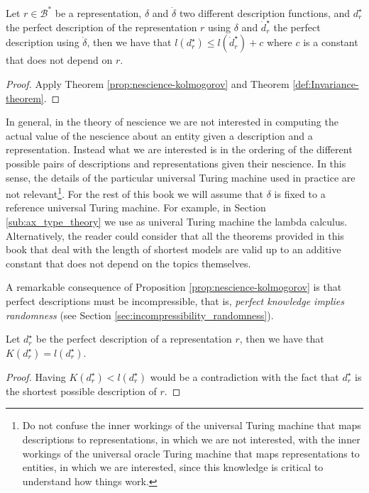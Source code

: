 \begin{corollary}
Let $r \in \mathcal{B}^\ast$ be a representation, $\delta$ and $\dot{\delta}$ two different description functions, and $d_r^{\star}$ the perfect description of the representation $r$ using $\delta$ and $\dot{d}_r^{\star}$ the perfect description using $\dot{\delta}$, then we have that $l \left( d_r^{\star} \right) \leq l \left( \dot{d}_r^{\star} \right) + c$ where $c$ is a constant that does not depend on $r$.
\end{corollary}
\begin{proof}
Apply Theorem \ref{prop:nescience-kolmogorov} and Theorem \ref{def:Invariance-theorem}.
\end{proof}

In general, in the theory of nescience we are not interested in computing the actual value of the nescience about an entity given a description and a representation. Instead what we are interested is in the ordering of the different possible pairs of descriptions and representations given their nescience. In this sense, the details of the particular universal Turing machine used in practice are not relevant\footnote{Do not confuse the inner workings of the universal Turing machine that maps descriptions to representations, in which we are not interested, with the inner workings of the universal oracle Turing machine that maps representations to entities, in which we are interested, since this knowledge is critical to understand how things work.}. For the rest of this book we will assume that $\delta$ is fixed to a reference universal Turing machine. For example, in Section \ref{sub:ax_type_theory} we use as univeral Turing machine the lambda calculus. Alternatively, the reader could consider that all the theorems provided in this book that deal with the length of shortest models are valid up to an additive constant that does not depend on the topics themselves.

A remarkable consequence of Proposition \ref{prop:nescience-kolmogorov} is that perfect descriptions must be incompressible, that is, \emph{perfect knowledge implies randomness} (see Section \ref{sec:incompressibility_randomness}).

\begin{corollary}
Let $d_r^{\star}$ be the perfect description of a representation $r$, then we have that $K \left( d_r^{\star} \right) = l \left( d_r^{\star} \right)$.
\end{corollary}
\begin{proof}
Having $K \left( d_r^{\star} \right) < l \left( d_r^{\star} \right)$ would be a contradiction with the fact that $d_r^{\star}$ is the shortest possible description of $r$.
\end{proof}

